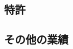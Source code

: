 \documentclass[11pt,a4paper,uplatex,twoside,dvipdfmx]{ujarticle} 	%
\newcommand{\研究課題名}{\mgfamily ストカスティックインフレーション, 原始ブラックホール, および重力波観測}
\newcommand{\研究機関名}{\mgfamily 名古屋大学}
\newcommand{\申請者氏名}{\mgfamily 多田 祐一郎}
\newcommand{\研究代表者氏名}{\申請者氏名}
\newcommand{\研究期間の最終元号年度}{34}	%
\begin{document}
\subsection{特許}
\newcommand{\特許等}{%
	
	特になし.

}

\subsection{その他の業績}
\newcommand{\その他の業績}{%
}





\end{document}

